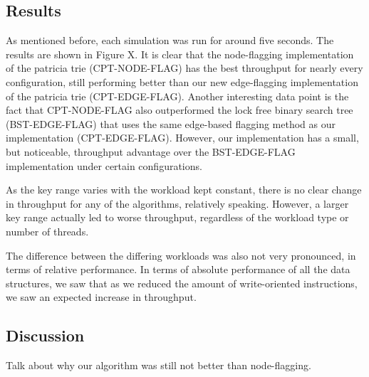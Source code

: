 \documentclass[conference]{IEEEtran}
\begin{document}
\subsection{Results}
As mentioned before, each simulation was run for around five seconds. The results are shown in Figure X.
It is clear that the node-flagging implementation of the patricia trie (CPT-NODE-FLAG) has the best throughput for nearly every configuration, still performing better than our new edge-flagging implementation of the patricia trie (CPT-EDGE-FLAG). Another interesting data point is the fact that CPT-NODE-FLAG also outperformed the lock free binary search tree (BST-EDGE-FLAG) that uses the same edge-based flagging method as our implementation (CPT-EDGE-FLAG). However, our implementation has a small, but noticeable, throughput advantage over the BST-EDGE-FLAG implementation under certain configurations. 
\par
As the key range varies with the workload kept constant, there is no clear change in throughput for any of the algorithms, relatively speaking. However, a larger key range actually led to worse throughput, regardless of the workload type or number of threads.
\par
The difference between the differing workloads was also not very pronounced, in terms of relative performance. In terms of absolute performance of all the data structures, we saw that as we reduced the amount of write-oriented instructions, we saw an expected increase in throughput.


\subsection{Discussion}
Talk about why our algorithm was still not better than node-flagging.
\end{document}
